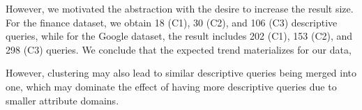 However, we
motivated the
abstraction with the desire to increase the result size. For the finance
dataset, we obtain 18 (C1), 30 (C2), and 106 (C3) descriptive queries, while
for the Google dataset, the result includes  202 (C1), 153 (C2), and 298
(C3) queries. We conclude that the expected trend materializes for our data,

However, clustering may also lead to similar descriptive queries
being merged
into one, which may dominate the effect of having more descriptive queries
due to smaller attribute domains.

